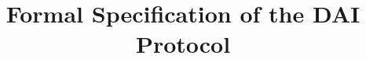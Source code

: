 \documentclass{article}
\begin{document}
\title{Formal Specification of the DAI Protocol}

\maketitle
\end{document}
